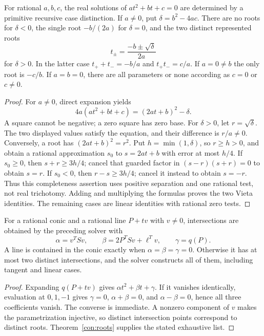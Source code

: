 \begin{theorem}\label{con:roots}
For rational $a,b,c$, the real solutions of $at^2+bt+c=0$ are determined
by a primitive recursive case distinction. If $a\ne0$, put
$\delta=b^2-4ac$. There are no roots for $\delta<0$, the single root
$-b/(2a)$ for $\delta=0$, and the two distinct represented roots
\[
 t_\pm=\frac{-b\pm\sqrt\delta}{2a}
\]
for $\delta>0$. In the latter case
$t_++t_-=-b/a$ and $t_+t_-=c/a$.
If $a=0\ne b$ the only root is $-c/b$. If $a=b=0$, there are all
parameters or none according as $c=0$ or $c\ne0$.
\end{theorem}
\begin{proof}
For $a\ne0$, direct expansion yields
\[
 4a(at^2+bt+c)=(2at+b)^2-\delta.
\]
A square cannot be negative; a zero square has zero base. For $\delta>0$,
let $r=\sqrt\delta$. The two displayed values satisfy the equation,
and their difference is $r/a\ne0$. Conversely, a root has
$(2at+b)^2=r^2$. Put $h=\min(1,\delta)$, so $r\ge h>0$, and obtain
a rational approximation $s_0$ to $s=2at+b$ with error at most $h/4$.
If $s_0\ge0$, then $s+r\ge3h/4$; cancel that guarded factor in
$(s-r)(s+r)=0$ to obtain $s=r$. If $s_0<0$, then $r-s\ge3h/4$;
cancel it instead to obtain $s=-r$. Thus this completeness assertion
uses positive separation and one rational test, not real trichotomy.
Adding and multiplying the formulas
proves the two Vieta identities. The remaining cases are linear
identities with rational zero tests.
\end{proof}

\begin{corollary}\label{con:line-intersection}
For a rational conic and a rational line $P+tv$ with $v\ne0$, intersections
are obtained by the preceding solver with
\[
 \alpha=v^TSv,\qquad \beta=2P^TSv+\ell^Tv,\qquad \gamma=q(P).
\]
A line is contained in the conic exactly when $\alpha=\beta=\gamma=0$.
Otherwise it has at most two distinct intersections, and the solver
constructs all of them, including tangent and linear cases.
\end{corollary}
\begin{proof}
Expanding $q(P+tv)$ gives $\alpha t^2+\beta t+\gamma$.
If it vanishes identically, evaluation at $0,1,-1$ gives
$\gamma=0$, $\alpha+\beta=0$, and $\alpha-\beta=0$, hence all three
coefficients vanish. The converse is immediate. A nonzero component
of $v$ makes the parametrization injective, so distinct intersection
points correspond to distinct roots. Theorem~\ref{con:roots} supplies
the stated exhaustive list.
\end{proof}

